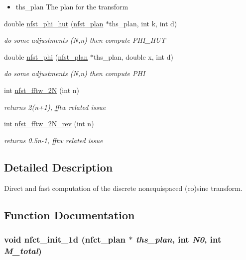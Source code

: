 \begin{CompactItemize}
\begin{CompactList}\small\item\em \begin{itemize}
\item ths\_\-plan The plan for the transform \end{itemize}
\item\end{CompactList}\item 
double \hyperlink{group__nfsct_ga2862de70644887849e0bc1df618a018}{nfst\_\-phi\_\-hut} (\hyperlink{structnfst__plan}{nfst\_\-plan} $\ast$ths\_\-plan, int k, int d)
\begin{CompactList}\small\item\em do some adjustments (N,n) then compute PHI\_\-HUT \item\end{CompactList}\item 
double \hyperlink{group__nfsct_gec803ab48734df96a9f21d66cbb71e23}{nfst\_\-phi} (\hyperlink{structnfst__plan}{nfst\_\-plan} $\ast$ths\_\-plan, double x, int d)
\begin{CompactList}\small\item\em do some adjustments (N,n) then compute PHI \item\end{CompactList}\item 
int \hyperlink{group__nfsct_ge2f6c7dd71f57ba413df7f9e0d9c8c6d}{nfst\_\-fftw\_\-2N} (int n)
\begin{CompactList}\small\item\em returns 2(n+1), fftw related issue \item\end{CompactList}\item 
int \hyperlink{group__nfsct_gd31424393fa4e91a19cd9a82776f2d74}{nfst\_\-fftw\_\-2N\_\-rev} (int n)
\begin{CompactList}\small\item\em returns 0.5n-1, fftw related issue \item\end{CompactList}\end{CompactItemize}


\subsection{Detailed Description}
Direct and fast computation of the discrete nonequispaced (co)sine transform. 

\subsection{Function Documentation}
\hypertarget{group__nfsct_gcdaa71ef0c4ea05c55a09a08845b3043}{
\subsubsection{\setlength{\rightskip}{0pt plus 5cm}void nfct\_\-init\_\-1d ({\bf nfct\_\-plan} $\ast$ {\em ths\_\-plan}, int {\em N0}, int {\em M\_\-total})}}
\label{group__nfsct_gcdaa71ef0c4ea05c55a09a08845b3043}


